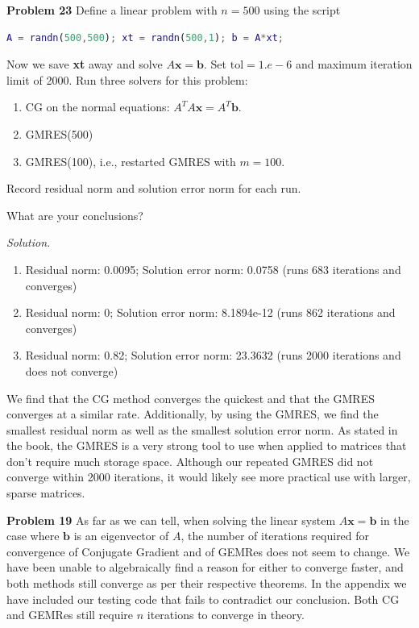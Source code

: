 \documentclass[12pt]{article}
\newcommand{\problem}[1]{\hspace{-4 ex} \large \textbf{Problem #1} }
\newcommand{\solution}{\vspace{2 ex} \hspace{-5 ex} \emph{Solution.} }
\begin{document}
\bigbreak

\problem{23} Define a linear problem with $ n = 500 $ using the script
\begin{lstlisting}[language=MATLAB]
A = randn(500,500); xt = randn(500,1); b = A*xt;
\end{lstlisting}
Now we save \textbf{xt} away and solve $ A\textbf{x} = \textbf{b} $. Set $ \text{tol} = 1.e-6 $ and maximum iteration limit of 2000. Run three solvers for this problem:
\begin{enumerate}[leftmargin=0.6cm,label=(\alph*)]
	\item CG on the normal equations: $ A^TA\textbf{x} = A^T\textbf{b} $.
	\item GMRES(500)
	\item GMRES(100), i.e., restarted GMRES with $ m = 100 $. 
\end{enumerate}
Record residual norm and solution error norm for each run.

What are your conclusions?

\solution
\begin{enumerate}[leftmargin=0.6cm,label=(\alph*)]
	\item Residual norm: 0.0095; Solution error norm: 0.0758 (runs 683 iterations and converges)
	\item Residual norm: 0; Solution error norm: 8.1894e-12 (runs 862 iterations and converges)
	\item Residual norm: 0.82; Solution error norm: 23.3632 (runs 2000 iterations and does not converge)
\end{enumerate}
We find that the CG method converges the quickest and that the GMRES converges at a similar rate. Additionally, by using the GMRES, we find the smallest residual norm as well as the smallest solution error norm. As stated in the book, the GMRES is a very strong tool to use when applied to matrices that don't require much storage space. Although our repeated GMRES did not converge within 2000 iterations, it would likely see more practical use with larger, sparse matrices. 


\bigbreak

\problem{19} As far as we can tell, when solving the linear system $A\textbf{x} = \textbf{b}$ in the case where $\textbf{b}$ is an eigenvector of $A$, the number of iterations required for convergence of Conjugate Gradient and of GEMRes does not seem to change. We have been unable to algebraically find a reason for either to converge faster, and both methods still converge as per their respective theorems. In the appendix we have included our testing code that fails to contradict our conclusion. Both CG and GEMRes still require $n$ iterations to converge in theory.
\end{document}
